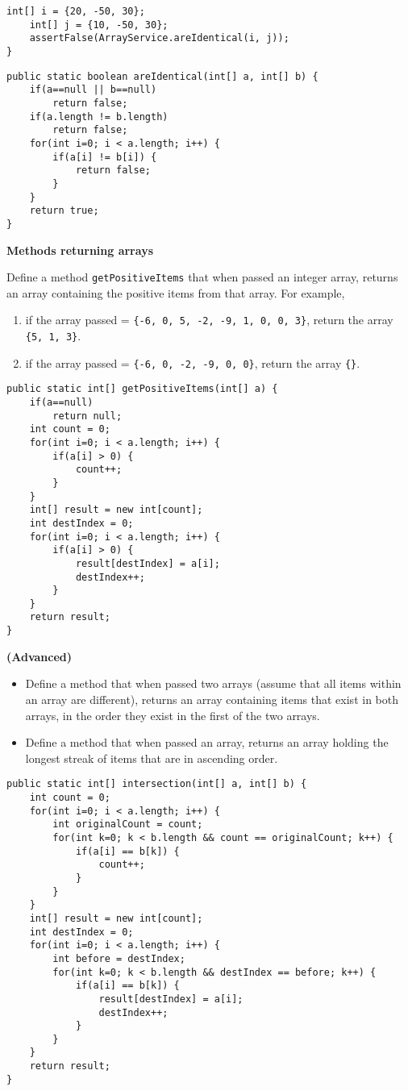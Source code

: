 \begin{questions}
\begin{lstlisting}[style=junit]
	int[] i = {20, -50, 30};
	int[] j = {10, -50, 30};
	assertFalse(ArrayService.areIdentical(i, j));
}
\end{lstlisting}
\ifprintanswers
\begin{lstlisting}
public static boolean areIdentical(int[] a, int[] b) {
	if(a==null || b==null)
		return false;
	if(a.length != b.length)
		return false;
	for(int i=0; i < a.length; i++) {
		if(a[i] != b[i]) {
			return false;
		}
	}
	return true;
}
\end{lstlisting}
\else
\newpage
\fi

\question \textbf{Methods returning arrays}

Define a method \texttt{getPositiveItems} that when passed an integer array, returns an array containing the positive items from that array. For example, 

\begin{enumerate}
	\item if the array passed = \texttt{\{-6, 0, 5, -2, -9, 1, 0, 0, 3\}}, return the array \texttt{\{5, 1, 3\}}.
	\item if the array passed = \texttt{\{-6, 0, -2, -9, 0, 0\}}, return the array \texttt{\{\}}.
\end{enumerate}
\ifprintanswers
\begin{lstlisting}
public static int[] getPositiveItems(int[] a) {
	if(a==null)
		return null;
	int count = 0;
	for(int i=0; i < a.length; i++) {
		if(a[i] > 0) {
			count++;
		}
	}
	int[] result = new int[count];
	int destIndex = 0;
	for(int i=0; i < a.length; i++) {
		if(a[i] > 0) {
			result[destIndex] = a[i];
			destIndex++;
		}
	}
	return result;
}
\end{lstlisting}

\else
\fi

\question \textbf{(Advanced)}

\begin{itemize}
  \item Define a method that when passed two arrays (assume that all items within an array are different), returns an array containing items that exist in both arrays, in the order they exist in the first of the two arrays.
  \item Define a method that when passed an array, returns an array holding the longest streak of items that are in ascending order.
\end{itemize}
\ifprintanswers
\newpage
\begin{lstlisting}[basicstyle=\small]
public static int[] intersection(int[] a, int[] b) {
	int count = 0;
	for(int i=0; i < a.length; i++) {
		int originalCount = count;
		for(int k=0; k < b.length && count == originalCount; k++) {
			if(a[i] == b[k]) {
				count++;
			}
		}
	}
	int[] result = new int[count];
	int destIndex = 0;
	for(int i=0; i < a.length; i++) {
		int before = destIndex;
		for(int k=0; k < b.length && destIndex == before; k++) {
			if(a[i] == b[k]) {
				result[destIndex] = a[i];
				destIndex++;
			}
		}
	}
	return result;
}


\end{lstlisting}
\end{questions}
